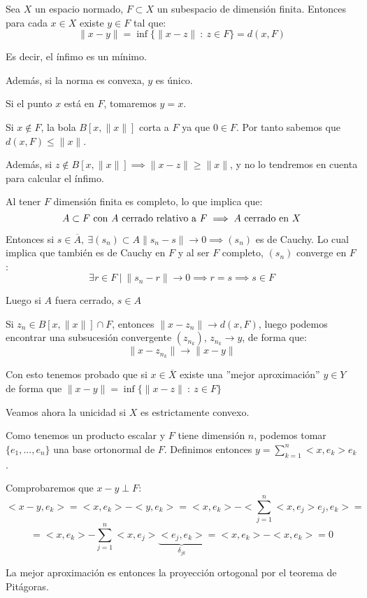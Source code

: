 \documentclass[openany]{book}
\begin{document}
\begin{proposition}
  Sea $ X $ un espacio normado, $ F \subset X $ un subespacio de dimensión finita. Entonces para cada $ x \in X $ existe $ y \in F $ tal que:
  $$ \|x-y\| = \inf \{\|x-z\|\ :\ z \in F\} = d(x,F) $$

  Es decir, el ínfimo es un mínimo.

  Además, si la norma es convexa, $ y $ es único.
\end{proposition}

\begin{demonstration}

  Si el punto $ x $ está en $ F $, tomaremos $ y = x $.

  Si $ x \not \in F $, la bola $ B[x,\|x\|] $ corta a $ F $ ya que $ 0 \in F $. Por tanto sabemos que $ d(x,F) \leq \|x\| $.
  
  Además, si $ z \not \in B[x,\|x\|] \implies \|x-z\| \geq  \|x\|$, y no lo tendremos en cuenta para calcular el ínfimo.

  Al tener $ F $ dimensión finita es completo, lo que implica que:
  $$ A \subset F\ \text{con $ A $ cerrado relativo a $ F $} \implies A\ \text{cerrado en $ X $} $$

  Entonces si $ s \in \overline{A},\ \exists (s_n)\subset A \|s_n-s\| \to 0 \implies (s_n)$ es de Cauchy. Lo cual implica que también es de Cauchy en $ F $ y al ser $ F $ completo, $ (s_n) $ converge en $ F $:
  $$ \exists r \in F\ |\ \|s_n - r\| \to 0 \implies r = s \implies s \in F $$

  Luego si $ A $ fuera cerrado, $ s \in A $

  Si $ z_n \in B[x,\|x\|] \cap F $, entonces $ \|x-z_n\| \to d(x,F) $, luego podemos encontrar una subsucesión convergente $ (z_{n_{k}}) $, $ z_{n_{k}} \to y $, de forma que:
  $$ \|x-z_{n_{k}}\| \to \|x-y\|$$

  Con esto tenemos probado que si $ x \in \overline{X} $ existe una ''mejor aproximación'' $ y \in Y $ de forma que $ \|x-y\| = \inf \{ \|x-z\|\ : \ z \in F\} $

  Veamos ahora la unicidad si $ X $ es estrictamente convexo.

  Como tenemos un producto escalar y $ F $ tiene dimensión $ n $, podemos tomar $ \{e_1,...,e_n\} $ una base ortonormal de $ F $. Definimos entonces $ y = \sum\limits_{k=1}^{n}<x,e_{k}>e_{k} $.
  
  Comprobaremos que $ x-y \perp F $:
  $$ <x-y,e_{k}> = <x,e_{k}> - <y,e_{k}> = <x,e_{k}> - <\sum\limits_{j=1}^{n}<x,e_j>e_j,e_{k}> =$$
  $$= <x,e_{k}>-\sum\limits_{j=1}^{n}<x,e_{j}>\underbrace{<e_j,e_{k}>}_{\delta_{jk}} = <x,e_{k}>-<x,e_{k}> = 0 $$

  La mejor aproximación es entonces la proyección ortogonal por el teorema de Pitágoras.
\end{demonstration}
\end{document}
